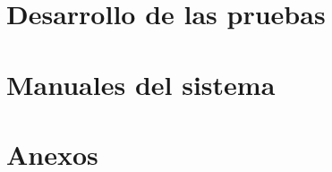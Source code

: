 \documentclass{report}
\begin{document}
\chapter{Desarrollo de las pruebas}
\label{chapter:desarrollo_pruebas}


\chapter{Manuales del sistema}
\label{chapter08}


\chapter{Anexos}
\label{anexos}


\printbibliography
\end{document}
